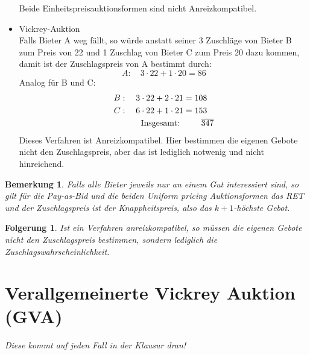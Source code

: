 \documentclass[12pt]{extreport} %
\theoremstyle{named}
\theoremstyle{itshape}
\theoremstyle{normal}
\newtheorem*{bemerkung}{Bemerkung}
\newtheorem*{folgerung*}{Folgerung}
\begin{document}
\begin{itemize}
\begin{itemize}
\begin{itemize}
				\end{itemize}
		\end{itemize} 
		Beide Einheitspreisauktionsformen sind nicht Anreizkompatibel.
	\item Vickrey-Auktion ~\\
		Falls Bieter A weg fällt, so würde anstatt seiner 3 Zuschläge von Bieter B zum Preis von 22 und 1 Zuschlag von  Bieter C zum Preis 20 dazu kommen, damit ist der Zuschlagspreis von A bestimmt durch:
		$$ A: \quad 3 \cdot 22 + 1 \cdot 20 = 86 $$
		Analog für B und C:
		\begin{align*}
			B: \quad 3 \cdot 22 + 2 \cdot 21 & = 108 \\
			C: \quad 6 \cdot 22 + 1 \cdot 21 & = 153 \\
			\text{ Insgesamt: } & \hspace{0.75cm} \overline{347}
		\end{align*}
		Dieses Verfahren ist Anreizkompatibel. Hier bestimmen die eigenen Gebote nicht den Zuschlagspreis, aber das ist lediglich notwenig und nicht hinreichend.
\end{itemize}

\begin{bemerkung}
	Falls alle Bieter jeweils nur an einem Gut interessiert sind, so gilt für die Pay-as-Bid und die beiden Uniform pricing Auktionsformen das RET und der Zuschlagspreis ist der Knappheitspreis, also das $k+1$-höchste Gebot.
\end{bemerkung}

\begin{folgerung*}
	Ist ein Verfahren anreizkompatibel, so müssen die eigenen Gebote nicht den Zuschlagspreis bestimmen, sondern lediglich die Zuschlagswahrscheinlichkeit.
\end{folgerung*}

\section{Verallgemeinerte Vickrey Auktion (GVA)}  


\textit{Diese kommt auf jeden Fall in der Klausur dran!} %
\end{document}
